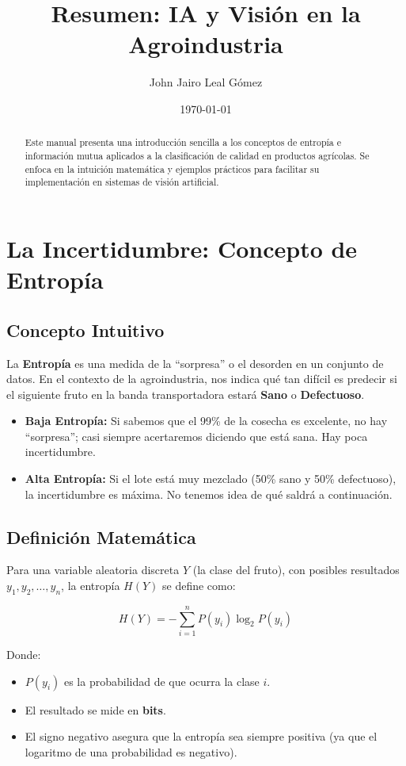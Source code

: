 \documentclass{article}
\title{Resumen: IA y Visión en la Agroindustria}
\author{John Jairo Leal Gómez}
\date{\today}
\begin{document}
\maketitle

\begin{abstract}
Este manual presenta una introducción sencilla a los conceptos de entropía e información mutua aplicados a la clasificación de calidad en productos agrícolas. Se enfoca en la intuición matemática y ejemplos prácticos para facilitar su implementación en sistemas de visión artificial.
\end{abstract}
\section{La Incertidumbre: Concepto de Entropía}

\subsection{Concepto Intuitivo}
La \textbf{Entropía} es una medida de la ``sorpresa'' o el desorden en un conjunto de datos. En el contexto de la agroindustria, nos indica qué tan difícil es predecir si el siguiente fruto en la banda transportadora estará \textbf{Sano} o \textbf{Defectuoso}.

\begin{itemize}
    \item \textbf{Baja Entropía:} Si sabemos que el 99\% de la cosecha es excelente, no hay ``sorpresa''; casi siempre acertaremos diciendo que está sana. Hay poca incertidumbre.
    \item \textbf{Alta Entropía:} Si el lote está muy mezclado (50\% sano y 50\% defectuoso), la incertidumbre es máxima. No tenemos idea de qué saldrá a continuación.
\end{itemize}



\subsection{Definición Matemática}
Para una variable aleatoria discreta $Y$ (la clase del fruto), con posibles resultados $y_1, y_2, \dots, y_n$, la entropía $H(Y)$ se define como:

\[ H(Y) = - \sum_{i=1}^{n} P(y_i) \log_2 P(y_i) \]

Donde:
\begin{itemize}
    \item $P(y_i)$ es la probabilidad de que ocurra la clase $i$.
    \item El resultado se mide en \textbf{bits}.
    \item El signo negativo asegura que la entropía sea siempre positiva (ya que el logaritmo de una probabilidad es negativo).
\end{itemize}
\end{document}
